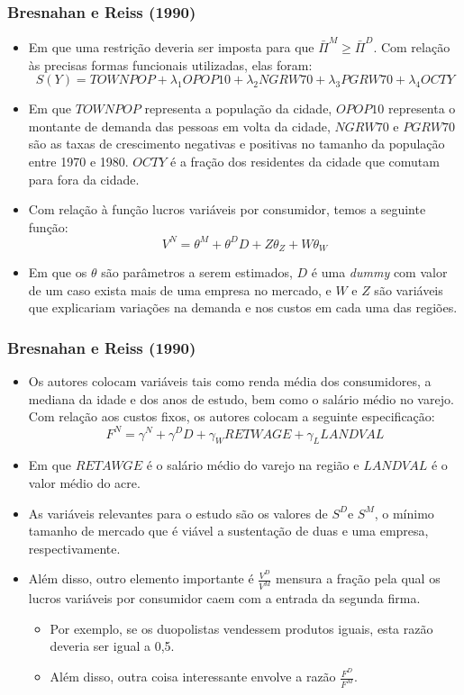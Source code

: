 \documentclass{beamer}
\begin{document}
\begin{frame}\frametitle{Bresnahan e Reiss (1990)}
\scriptsize
\begin{itemize}
\item Em que uma restrição deveria ser imposta para que $\bar{\Pi}^{M}\geq\bar{\Pi}^{D}$.
Com relação às precisas formas funcionais utilizadas, elas foram:
\[
S(Y)=TOWNPOP+\lambda_{1}OPOP10+\lambda_{2}NGRW70+\lambda_{3}PGRW70+\lambda_{4}OCTY
\]
\item Em que $TOWNPOP$ representa a população da cidade, $OPOP10$ representa
o montante de demanda das pessoas em volta da cidade, $NGRW70$ e
$PGRW70$ são as taxas de crescimento negativas e positivas no tamanho
da população entre 1970 e 1980. $OCTY$ é a fração dos residentes
da cidade que comutam para fora da cidade. 
\item Com relação à função lucros variáveis por consumidor, temos a seguinte
função:
\[
V^{N}=\theta^{M}+\theta^{D}D+Z\theta_{Z}+W\theta_{W}
\]
\item Em que os $\theta$ são parâmetros a serem estimados, $D$ é uma \emph{dummy}
com valor de um caso exista mais de uma empresa no mercado, e $W$
e $Z$ são variáveis que explicariam variações na demanda e nos custos
em cada uma das regiões. 
\end{itemize}
\end{frame}

\begin{frame}\frametitle{Bresnahan e Reiss (1990)}
\scriptsize
\begin{itemize}
\item Os autores colocam variáveis tais como renda média dos consumidores,
a mediana da idade e dos anos de estudo, bem como o salário médio
no varejo. Com relação aos custos fixos, os autores colocam a seguinte
especificação:
\[
F^{N}=\gamma^{N}+\gamma^{D}D+\gamma_{W}RETWAGE+\gamma_{L}LANDVAL
\]
\item Em que $RETAWGE$ é o salário médio do varejo na região e $LANDVAL$
é o valor médio do acre. 
\item As variáveis relevantes para o estudo são os valores de $S^{D}$e
$S^{M}$, o mínimo tamanho de mercado que é viável a sustentação de
duas e uma empresa, respectivamente. 
\item Além disso, outro elemento importante é $\frac{V^{D}}{V^{M}}$ mensura
a fração pela qual os lucros variáveis por consumidor caem com a entrada
da segunda firma. 

\begin{itemize}
\item Por exemplo, se os duopolistas vendessem produtos iguais, esta razão
deveria ser igual a 0,5. 
\item Além disso, outra coisa interessante envolve a razão $\frac{F^{D}}{F^{M}}$. 
\end{itemize}
\end{itemize}
\end{frame}
\end{document}
